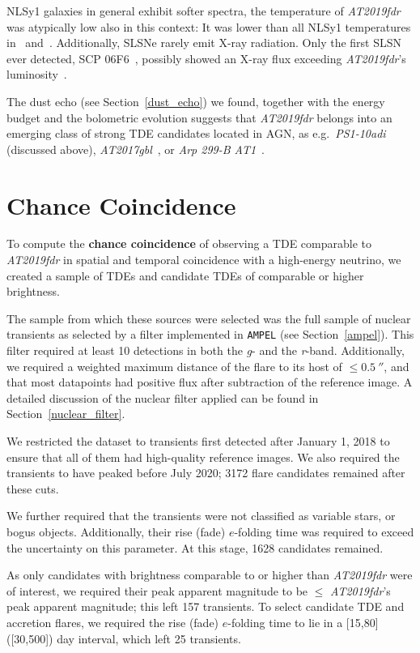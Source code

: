 NLSy1 galaxies in general exhibit softer spectra, the temperature of \emph{AT2019fdr} was atypically low also in this context: It was lower than all NLSy1 temperatures in~ and~. Additionally, SLSNe rarely emit X-ray radiation. Only the first SLSN ever detected, SCP 06F6~, possibly showed an X-ray flux exceeding \emph{AT2019fdr}'s luminosity~.

The dust echo (see Section~\ref{dust_echo}) we found, together with the energy budget and the bolometric evolution suggests that \emph{AT2019fdr} belongs into an emerging class of strong TDE candidates located in AGN, as e.g.\ \emph{PS1-10adi} (discussed above), \emph{AT2017gbl}~, or \emph{Arp 299-B AT1}~.

\section{Chance Coincidence}
To compute the \textbf{chance coincidence} of observing a TDE comparable to \emph{AT2019fdr} in spatial and temporal coincidence with a high-energy neutrino, we created a sample of TDEs and candidate TDEs of comparable or higher brightness.

The sample from which these sources were selected was the full sample of nuclear transients as selected by a filter implemented in \texttt{AMPEL} (see Section~\ref{ampel}). This filter required at least 10 detections in both the \textit{g}- and the \textit{r}-band. Additionally, we required a weighted maximum distance of the flare to its host of $\leq \SI{0.5}{\arcsecond}$, and that most datapoints had positive flux after subtraction of the reference image. A detailed discussion of the nuclear filter applied can be found in Section~\ref{nuclear_filter}.

We restricted the dataset to transients first detected after January 1, 2018 to ensure that all of them had high-quality reference images. We also required the transients to have peaked before July 2020; 3172 flare candidates remained after these cuts.

We further required that the transients were not classified as variable stars, or bogus objects. Additionally, their rise (fade) $e$-folding time was required to exceed the uncertainty on this parameter. At this stage, 1628 candidates remained.

As only candidates with brightness comparable to or higher than \emph{AT2019fdr} were of interest, we required their peak apparent magnitude to be $\leq$ \emph{AT2019fdr}'s peak apparent magnitude; this left 157 transients. To select candidate TDE and accretion flares, we required the rise (fade) $e$-folding time to lie in a [15,80] ([30,500]) day interval, which left 25 transients.

